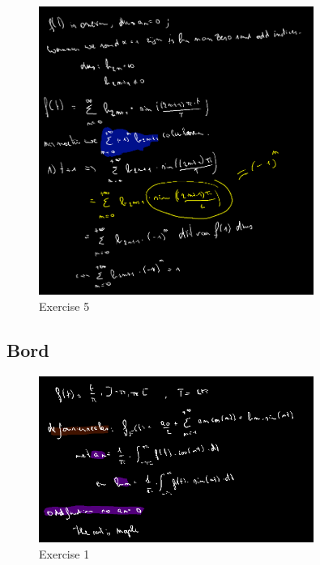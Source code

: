 \documentclass[a4paper]{report}
\begin{document}
\begin{figure}[H]
	\centering
	\includegraphics[width=0.8\textwidth]{assets/wc_9_ex_5.png}
	\caption{Exercise 5}
	\label{fig:wc_9_ex_5}
\end{figure}

\subsection{Bord}

\begin{figure}[H]
	\centering
	\includegraphics[width=0.8\textwidth]{assets/bord_9_ex_1.png}
	\caption{Exercise 1}
	\label{fig:bord_9_ex_1}
\end{figure}


\end{document}
